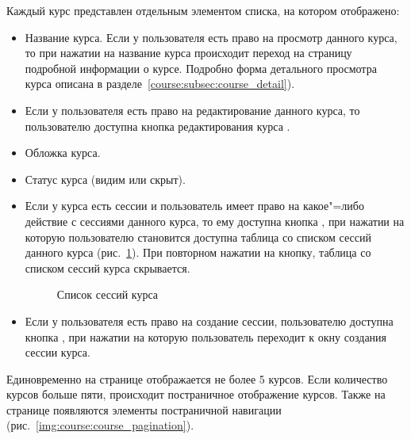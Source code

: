Каждый курс представлен отдельным элементом списка, на котором отображено:
\begin{itemize}
	\item Название курса. Если у пользователя есть право на просмотр данного курса, то при нажатии на название курса происходит переход на страницу подробной информации о курсе. Подробно форма детального просмотра курса описана в разделе~\ref{course:subsec:course_detail}).
	\item Если у пользователя есть право на редактирование данного курса, то пользователю доступна кнопка редактирования курса .
	\item Обложка курса.
	\item Статус курса (видим или скрыт).
	\item Если у курса есть сессии и пользователь имеет право на какое"=либо действие с сессиями данного курса, то ему доступна кнопка , при нажатии на которую пользователю становится доступна таблица со списком сессий данного курса (рис.~\ref{img:course:course_session_list}). При повторном нажатии на кнопку, таблица со списком сессий курса скрывается.
	\begin{figure}[H]
		\caption{Список сессий курса}
		\label{img:course:course_session_list}
	\end{figure}
	
	\item Если у пользователя есть право на создание сессии, пользователю доступна кнопка , при нажатии на которую пользователь переходит к окну создания сессии курса.
\end{itemize}

Единовременно на странице отображается не более 5 курсов. Если количество курсов больше пяти, происходит постраничное отображение курсов. Также на странице появляются элементы постраничной навигации (рис.~\ref{img:course:course_pagination}).

